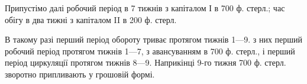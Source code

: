 Припустімо далі робочий період в 7 тижнів з капіталом І в 700 ф.
стерл.; час обігу в два тижні з капіталом II в 200 ф. стерл.

В такому разі перший період обороту триває протягом тижнів 1—9.
з них перший робочий період протягом тижнів 1—7, з авансуванням
в 700 ф. стерл., і перший період циркуляції протягом тижнів 8—9. Наприкінці
9-го тижня 700 ф. стерл. зворотно припливають у грошовій формі.
